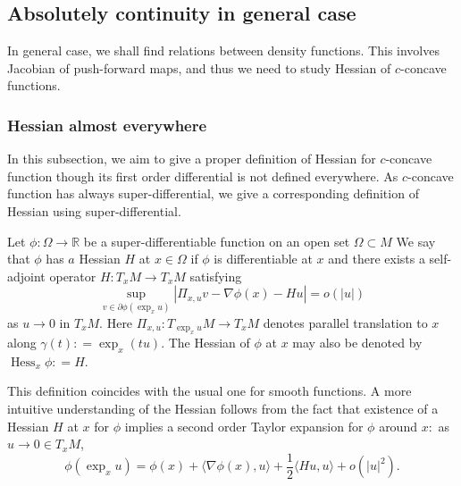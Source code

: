 \subsection{Absolutely continuity in general case}

In general case, we shall find relations between density functions.
This involves Jacobian of push-forward maps,
and thus we need to study Hessian of $c$-concave functions.

\subsubsection{Hessian almost everywhere}

In this subsection, we aim to give a proper definition of Hessian
for $c$-concave function
though its first order differential is not defined everywhere.
As $c$-concave function has always super-differential, we give a corresponding
definition of Hessian using super-differential.

\begin{defn}[Hessian]
	Let \( \phi : \Omega \rightarrow \mathbb { R } \) be
	a	super-differentiable function
	on an open set \( \Omega \subset M \)
	We say that \( \phi \) has \( a \) Hessian \( H \) at \( x \in \Omega \) if \( \phi \) is differentiable at \( x \)
	and there exists a self-adjoint operator \( H : T _ { x } M \rightarrow T _ { x } M \) satisfying
	\begin{equation}
		\label{defn:hessian}
		\sup _ { v \in \partial \phi \left( \exp _ { x } u \right) } \left| \Pi _ { x , u } v - \nabla \phi ( x ) - H u \right| = o ( | u | )
	\end{equation}
	as \( u \rightarrow 0 \) in \( T _ { x } M \). Here \( \Pi _ { x , u } : T _ { \exp _ { x } u } M \rightarrow T _ { x } M \) denotes parallel translation to \( x \) along \( \gamma ( t ) : = \exp _ { x } ( t u ) . \) The Hessian of \( \phi \) at \( x \) may also be denoted
	by \( \operatorname { Hess } _ { x } \phi : = H \).
\end{defn}

This definition coincides with the usual one for smooth functions. A more intuitive understanding of the Hessian follows from the fact that existence of a Hessian \( H \) at \( x \) for \( \phi \) implies a second order Taylor expansion for \( \phi \) around \( x : \) as \( u \rightarrow 0 \in T _ { x } M \),
\begin{equation}
	\label{equa:hessian_expan}
	\phi \left( \exp _ { x } u \right) = \phi ( x ) + \langle \nabla \phi ( x ) , u \rangle + \frac { 1 } { 2 } \langle H u , u \rangle + o \left( | u | ^ { 2 } \right).
\end{equation}

